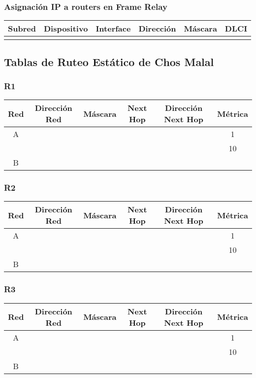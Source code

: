 \documentclass[12pt,a4paper,spanish]{article}
\begin{document}
\subsubsection{Asignación IP a routers en Frame Relay}

\begin{tabular}{|c|c|c|c|c|c|}
	\hline
	Subred & Dispositivo & Interface & Dirección & Máscara & DLCI \\
	\hline	
	\hline
	 &  &  &  &  &  \\
	\hline
\end{tabular}



\subsection{Tablas de Ruteo Estático de Chos Malal}
\subsubsection{R1}
\begin{tabular}{|c|c|c|c|c|c|}
	\hline
	Red & Dirección Red & Máscara & Next Hop & Dirección Next Hop & Métrica \\
	\hline
	\hline
	A &  &  &  &  & 1\\ %
 	  &  &  &  &  & 10 \\ %
	\hline	
	B & & & & &\\
	\hline
\end{tabular}

\subsubsection{R2}
\begin{tabular}{|c|c|c|c|c|c|}
	\hline
	Red & Dirección Red & Máscara & Next Hop & Dirección Next Hop & Métrica \\
	\hline
	\hline
	A &  &  &  &  & 1\\
 	  &  &  &  &  & 10 \\
	\hline	
	B & & & & &\\
	\hline
\end{tabular}


\subsubsection{R3}
\begin{tabular}{|c|c|c|c|c|c|}
	\hline
	Red & Dirección Red & Máscara & Next Hop & Dirección Next Hop & Métrica \\
	\hline
	\hline
	A &  &  &  &  & 1\\
 	  &  &  &  &  & 10 \\
	\hline	
	B & & & & &\\
	\hline
\end{tabular}
\end{document}
